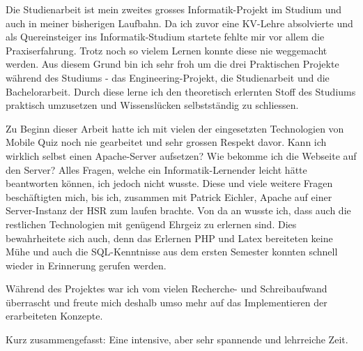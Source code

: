 
Die Studienarbeit ist mein zweites grosses Informatik-Projekt im Studium und auch in meiner bisherigen Laufbahn. Da ich zuvor eine KV-Lehre absolvierte und als Quereinsteiger ins Informatik-Studium startete fehlte mir vor allem die Praxiserfahrung. Trotz noch so vielem Lernen konnte diese nie weggemacht werden. Aus diesem Grund bin ich sehr froh um die drei Praktischen Projekte während des Studiums - das Engineering-Projekt, die Studienarbeit und die Bachelorarbeit. Durch diese lerne ich den theoretisch erlernten Stoff des Studiums praktisch umzusetzen und Wissenslücken selbstständig zu schliessen.

\bigskip

Zu Beginn dieser Arbeit hatte ich mit vielen der eingesetzten Technologien von Mobile Quiz noch nie gearbeitet und sehr grossen Respekt davor. Kann ich wirklich selbst einen Apache-Server aufsetzen? Wie bekomme ich die Webseite auf den Server? Alles Fragen, welche ein Informatik-Lernender leicht hätte beantworten können, ich jedoch nicht wusste.
Diese und viele weitere Fragen beschäftigten mich, bis ich, zusammen mit Patrick Eichler, Apache auf einer Server-Instanz der HSR zum laufen brachte. Von da an wusste ich, dass auch die restlichen Technologien mit genügend Ehrgeiz zu erlernen sind. Dies bewahrheitete sich auch, denn das Erlernen PHP und Latex bereiteten keine Mühe und auch die SQL-Kenntnisse aus dem ersten Semester konnten schnell wieder in Erinnerung gerufen werden.

\bigskip

Während des Projektes war ich vom vielen Recherche- und Schreibaufwand überrascht und freute mich deshalb umso mehr auf das Implementieren der erarbeiteten Konzepte.

\bigskip

Kurz zusammengefasst: Eine intensive, aber sehr spannende und lehrreiche Zeit.